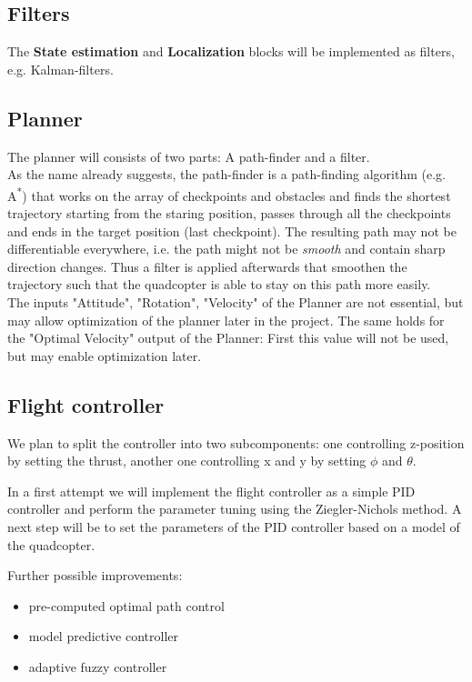 \documentclass[a4paper,footsepline]{scrartcl}
\begin{document}
\subsection*{Filters}
The \textbf{State estimation} and \textbf{Localization} blocks will be implemented as filters, e.g. Kalman-filters.
\subsection*{Planner}
The planner will consists of two parts: A path-finder and a filter.\\
As the name already suggests, the path-finder is a path-finding algorithm (e.g. A\textsuperscript{*}) that works on the array of checkpoints and obstacles and finds the shortest trajectory starting from the staring position, passes through all the checkpoints and ends in the target position (last checkpoint). The resulting path may not be differentiable everywhere, i.e. the path might not be \emph{smooth} and contain sharp direction changes. Thus a filter is applied afterwards that smoothen the trajectory such that the quadcopter is able to stay on this path more easily.
\vspace{0.2cm}\\
The inputs "Attitude", "Rotation", "Velocity" of the Planner are not essential, but may allow optimization of the planner later in the project.
The same holds for the "Optimal Velocity" output of the Planner: First this value will not be used, but may enable optimization later.
\subsection*{Flight controller}
We plan to split the controller into two subcomponents: one controlling z-position by setting the thrust, another one controlling x and y by setting $\phi$ and $\theta$.

In a first attempt we will implement the flight controller as a simple PID controller and perform the parameter tuning using the Ziegler-Nichols method.
A next step will be to set the parameters of the PID controller based on a model of the quadcopter.

Further possible improvements:
\begin{itemize}
\item pre-computed optimal path control
\item model predictive controller
\item adaptive fuzzy controller
\end{itemize}
\end{document}
